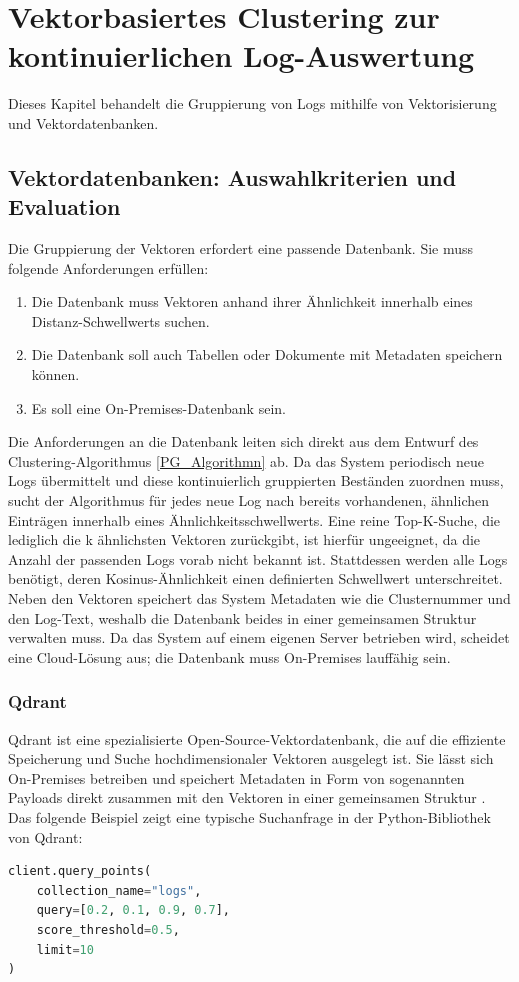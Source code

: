 \chapter{Vektorbasiertes Clustering zur kontinuierlichen Log-Auswertung}\label{chap:vek}
Dieses Kapitel behandelt die Gruppierung von Logs mithilfe von Vektorisierung und Vektordatenbanken.

\section{Vektordatenbanken: Auswahlkriterien und Evaluation}

Die Gruppierung der Vektoren erfordert eine passende Datenbank. Sie muss folgende Anforderungen erfüllen:

\begin{enumerate}
    \item Die Datenbank muss Vektoren anhand ihrer Ähnlichkeit innerhalb eines Distanz-Schwellwerts suchen.
    \item Die Datenbank soll auch Tabellen oder Dokumente mit Metadaten speichern können.
    \item Es soll eine On-Premises-Datenbank sein.
\end{enumerate}

Die Anforderungen an die Datenbank leiten sich direkt aus dem Entwurf des Clustering-Algorithmus \ref{PG_Algorithmn} ab. Da das System periodisch neue Logs übermittelt und diese kontinuierlich gruppierten Beständen zuordnen muss, sucht der Algorithmus für jedes neue Log nach bereits vorhandenen, ähnlichen Einträgen innerhalb eines Ähnlichkeitsschwellwerts. Eine reine Top-K-Suche, die lediglich die k ähnlichsten Vektoren zurückgibt, ist hierfür ungeeignet, da die Anzahl der passenden Logs vorab nicht bekannt ist. Stattdessen werden alle Logs benötigt, deren Kosinus-Ähnlichkeit einen definierten Schwellwert unterschreitet. Neben den Vektoren speichert das System Metadaten wie die Clusternummer und den Log-Text, weshalb die Datenbank beides in einer gemeinsamen Struktur verwalten muss. Da das System auf einem eigenen Server betrieben wird, scheidet eine Cloud-Lösung aus; die Datenbank muss On-Premises lauffähig sein.

\subsection{Qdrant}

Qdrant \cite{qdrantQdrantVector} ist eine spezialisierte Open-Source-Vektordatenbank, 
die auf die effiziente Speicherung und Suche hochdimensionaler Vektoren ausgelegt 
ist. Sie lässt sich On-Premises betreiben und speichert Metadaten in Form von 
sogenannten Payloads direkt zusammen mit den Vektoren in einer gemeinsamen 
Struktur \cite{qdrantPayloadQdrant}. Das folgende Beispiel zeigt eine typische 
Suchanfrage in der Python-Bibliothek von Qdrant:
\begin{lstlisting}[language=Python]
client.query_points(
    collection_name="logs",
    query=[0.2, 0.1, 0.9, 0.7],
    score_threshold=0.5,
    limit=10
)
\end{lstlisting}
